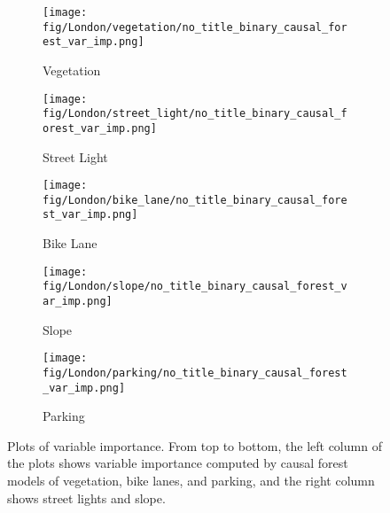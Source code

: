 \documentclass[preprint,12pt, authoryear]{elsarticle}
\begin{document}
\begin{figure}
    \centering
    \begin{subfigure}{.35\textwidth}
        \centering
        \texttt{[image: fig/London/vegetation/no\_title\_binary\_causal\_forest\_var\_imp.png]}
        \caption*{Vegetation}
    \end{subfigure}%
    \hfill
    \begin{subfigure}{.35\textwidth}
        \centering
        \texttt{[image: fig/London/street\_light/no\_title\_binary\_causal\_forest\_var\_imp.png]}
        \caption*{Street Light}
    \end{subfigure}

    \begin{subfigure}{.35\textwidth}
        \centering
        \texttt{[image: fig/London/bike\_lane/no\_title\_binary\_causal\_forest\_var\_imp.png]}
        \caption*{Bike Lane}
    \end{subfigure}%
    \hfill
    \begin{subfigure}{.35\textwidth}
        \centering
        \texttt{[image: fig/London/slope/no\_title\_binary\_causal\_forest\_var\_imp.png]}
        \caption*{Slope}
    \end{subfigure}

    \begin{subfigure}{.35\textwidth}
        \centering
        \texttt{[image: fig/London/parking/no\_title\_binary\_causal\_forest\_var\_imp.png]}
        \caption*{Parking}
    \end{subfigure}%
    \hfill
    \begin{subfigure}{.35\textwidth}
    \end{subfigure}

    \caption{Plots of variable importance. From top to bottom, the left column of the plots shows variable importance computed by causal forest models of vegetation, bike lanes, and parking, and the right column shows street lights and slope.}
    \label{result:fig:var_imp}
\end{figure}
\end{document}
